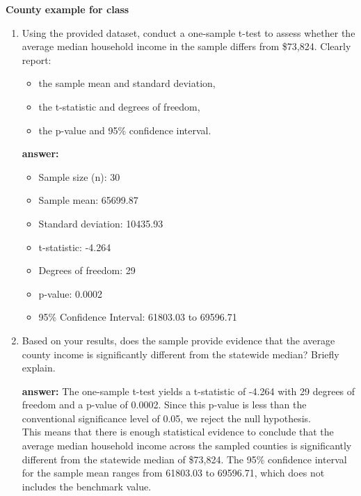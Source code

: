 \documentclass[12pt]{article}
\begin{document}
\textbf{County example for class}
\begin{enumerate}[label=\alph*)]
\item Using the provided dataset, conduct a one-sample t-test to assess whether the average median household income in the sample differs from \$73{,}824. Clearly report:
\begin{itemize}
\item the sample mean and standard deviation,
\item the t-statistic and degrees of freedom,
\item the p-value and 95\% confidence interval.
\end{itemize}


\textbf{answer:}
\begin{itemize}
    \item Sample size (n): 30 
    \item Sample mean: 65699.87 
    \item Standard deviation: 10435.93 
    \item t-statistic: -4.264 
    \item Degrees of freedom: 29 
    \item p-value: 0.0002 
    \item 95\% Confidence Interval: 61803.03 to 69596.71 
\end{itemize}

\item Based on your results, does the sample provide evidence that the average county income is significantly different from the statewide median? Briefly explain.

\textbf{answer:}
The one-sample t-test yields a t-statistic of -4.264 with 29 degrees of freedom and a p-value of 0.0002. Since this p-value is less than the conventional significance level of 0.05, we reject the null hypothesis.\\

This means that there is enough statistical evidence to conclude that the average median household income across the sampled counties is significantly different from the statewide median of \$73,824. The 95\% confidence interval for the sample mean ranges from 61803.03 to 69596.71, which does not includes the benchmark value.

\end{enumerate}
\end{document}
